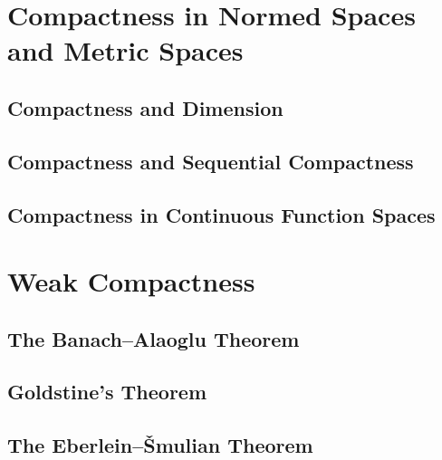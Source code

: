 \documentclass[10pt]{mypackage}
\begin{document}
\section{Compactness in Normed Spaces and Metric Spaces}%
\subsection{Compactness and Dimension}%
\subsection{Compactness and Sequential Compactness}%
\subsection{Compactness in Continuous Function Spaces}%
\section{Weak Compactness}%
\subsection{The Banach--Alaoglu Theorem}%
\subsection{Goldstine's Theorem}%
\subsection{The Eberlein--\v{S}mulian Theorem}%
\end{document}
